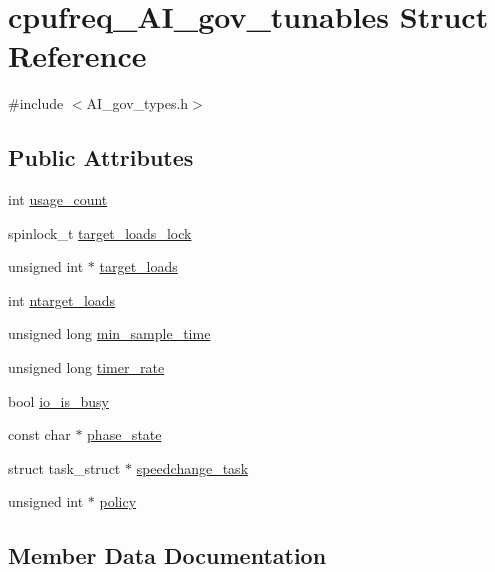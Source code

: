 \hypertarget{structcpufreq__AI__gov__tunables}{}\section{cpufreq\+\_\+\+A\+I\+\_\+gov\+\_\+tunables Struct Reference}
\label{structcpufreq__AI__gov__tunables}


{\ttfamily \#include $<$A\+I\+\_\+gov\+\_\+types.\+h$>$}

\subsection*{Public Attributes}
\begin{DoxyCompactItemize}
\item 
int \hyperlink{structcpufreq__AI__gov__tunables_aa3d244826e696ed22f060f41860b731e}{usage\+\_\+count}
\item 
spinlock\+\_\+t \hyperlink{structcpufreq__AI__gov__tunables_a211d535163794567b7a1eac9027a499d}{target\+\_\+loads\+\_\+lock}
\item 
unsigned int $\ast$ \hyperlink{structcpufreq__AI__gov__tunables_a611864a1aa6dda665583ffab47ddfdb5}{target\+\_\+loads}
\item 
int \hyperlink{structcpufreq__AI__gov__tunables_a0190cac58bd1c734d3afa553612fc5a1}{ntarget\+\_\+loads}
\item 
unsigned long \hyperlink{structcpufreq__AI__gov__tunables_a1325f155060e24773ebd3dd4705ec11b}{min\+\_\+sample\+\_\+time}
\item 
unsigned long \hyperlink{structcpufreq__AI__gov__tunables_ae2890ab33e5f75ebd016237f0838b913}{timer\+\_\+rate}
\item 
bool \hyperlink{structcpufreq__AI__gov__tunables_afdb3833580eb3c6ee9aac606b3637ea2}{io\+\_\+is\+\_\+busy}
\item 
const char $\ast$ \hyperlink{structcpufreq__AI__gov__tunables_a7e4a7fe41ccb790c79fa54bf769a72aa}{phase\+\_\+state}
\item 
struct task\+\_\+struct $\ast$ \hyperlink{structcpufreq__AI__gov__tunables_a2640e41db04f80501bf4dfe6c0385f24}{speedchange\+\_\+task}
\item 
unsigned int $\ast$ \hyperlink{structcpufreq__AI__gov__tunables_a9b403cbf93797824dd7fb98c540cfcf3}{policy}
\end{DoxyCompactItemize}


\subsection{Member Data Documentation}
\mbox{\label{structcpufreq__AI__gov__tunables_afdb3833580eb3c6ee9aac606b3637ea2}} 
